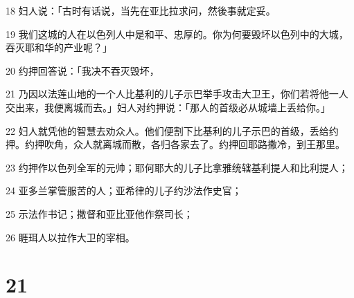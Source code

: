 \par 18 妇人说：「古时有话说，当先在亚比拉求问，然後事就定妥。
\par 19 我们这城的人在以色列人中是和平、忠厚的。你为何要毁坏以色列中的大城，吞灭耶和华的产业呢？」
\par 20 约押回答说：「我决不吞灭毁坏，
\par 21 乃因以法莲山地的一个人比基利的儿子示巴举手攻击大卫王，你们若将他一人交出来，我便离城而去。」妇人对约押说：「那人的首级必从城墙上丢给你。」
\par 22 妇人就凭他的智慧去劝众人。他们便割下比基利的儿子示巴的首级，丢给约押。约押吹角，众人就离城而散，各归各家去了。约押回耶路撒冷，到王那里。
\par 23 约押作以色列全军的元帅；耶何耶大的儿子比拿雅统辖基利提人和比利提人；
\par 24 亚多兰掌管服苦的人；亚希律的儿子约沙法作史官；
\par 25 示法作书记；撒督和亚比亚他作祭司长；
\par 26 睚珥人以拉作大卫的宰相。

\chapter{21}

